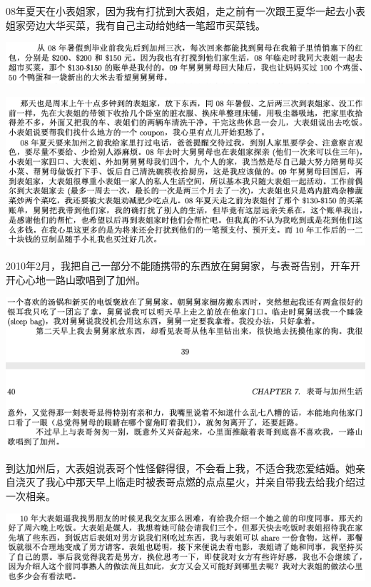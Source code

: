 \documentclass[9pt, b5paper]{article}
\begin{document}
08年夏天在小表姐家，因为我有打扰到大表姐，走之前有一次跟王夏华一起去小表姐家旁边大华买菜，我有自己主动给她结一笔超市买菜钱。 

\begin{center}
\includegraphics[width=.9\linewidth]{./pic/p1p47.png}
\end{center}

\begin{center}
\includegraphics[width=.9\linewidth]{./pic/p1p91-2.png}
\end{center}

2010年2月，我把自己一部分不能随携带的东西放在舅舅家，与表哥告别，开车开开心心地一路山歌唱到了加州。

\begin{center}
\includegraphics[width=.9\linewidth]{./pic/p1p39.png}
\end{center}

到达加州后，大表姐说表哥个性怪僻得很，不会看上我，不适合我恋爱结婚。她亲自浇灭了我心中那天早上临走时被表哥点燃的点点星火，并亲自带我去给我介绍过一次相亲。

\begin{center}
\includegraphics[width=.9\linewidth]{./pic/p1p123.png}
\end{center}
\end{document}
